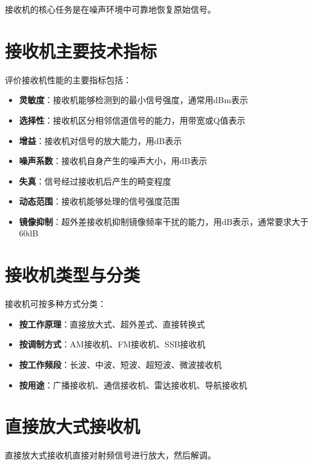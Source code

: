 接收机的核心任务是在噪声环境中可靠地恢复原始信号。

\section{接收机主要技术指标}
\label{sec:receiver_specifications}

评价接收机性能的主要指标包括：

\begin{itemize}
    \item \textbf{灵敏度}：接收机能够检测到的最小信号强度，通常用dBm表示
    \item \textbf{选择性}：接收机区分相邻信道信号的能力，用带宽或Q值表示
    \item \textbf{增益}：接收机对信号的放大能力，用dB表示
    \item \textbf{噪声系数}：接收机自身产生的噪声大小，用dB表示
    \item \textbf{失真}：信号经过接收机后产生的畸变程度
    \item \textbf{动态范围}：接收机能够处理的信号强度范围
    \item \textbf{镜像抑制}：超外差接收机抑制镜像频率干扰的能力，用dB表示，通常要求大于60dB
\end{itemize}

\section{接收机类型与分类}
\label{sec:receiver_classification}

接收机可按多种方式分类：

\begin{itemize}
    \item \textbf{按工作原理}：直接放大式、超外差式、直接转换式
    \item \textbf{按调制方式}：AM接收机、FM接收机、SSB接收机
    \item \textbf{按工作频段}：长波、中波、短波、超短波、微波接收机
    \item \textbf{按用途}：广播接收机、通信接收机、雷达接收机、导航接收机
\end{itemize}

\section{直接放大式接收机}
\label{sec:direct_amplification_receiver}

直接放大式接收机直接对射频信号进行放大，然后解调。

